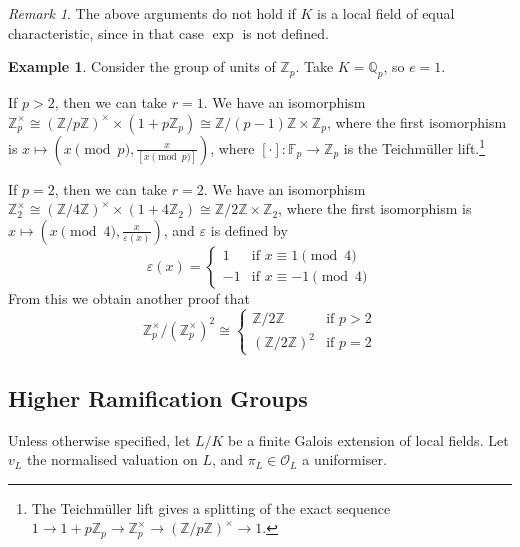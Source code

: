\documentclass[11pt]{article}
\theoremstyle{definition}
\newtheorem*{example}{Example}
\theoremstyle{plain}
\theoremstyle{remark}
\newtheorem*{remark}{Remark}
\newcommand{\FF}{\mathbb{F}}
\newcommand{\ZZ}{\mathbb{Z}}
\newcommand{\QQ}{\mathbb{Q}}
\newcommand{\cO}{\mathcal{O}}
\begin{document}
\begin{remark}
    The above arguments do not hold if $K$ is a local field of equal characteristic, since in that case $\exp$ is not defined.
\end{remark}

\begin{example}
    Consider the group of units of $\ZZ_p$. Take $K = \QQ_p$, so $e = 1$.

    If $p > 2$, then we can take $r = 1$.
    We have an isomorphism $\ZZ_p^\times \cong (\ZZ / p \ZZ)^\times \times (1 + p \ZZ_p) \cong \ZZ / (p-1) \ZZ \times \ZZ_p$, where the first isomorphism is $x \mapsto (x \pmod{p}, \frac{x}{[x \pmod{p}]})$, where $[\cdot] : \FF_p \to \ZZ_p$ is the Teichm\"uller lift.\footnote{The Teichm\"uller lift gives a splitting of the exact sequence $1 \rightarrow 1 + p \ZZ_p \rightarrow \ZZ_p^\times \rightarrow (\ZZ / p \ZZ)^\times \rightarrow 1$.}

    If $p = 2$, then we can take $r = 2$. We have an isomorphism $\ZZ_2^\times \cong (\ZZ / 4 \ZZ)^\times \times (1 + 4 \ZZ_2) \cong \ZZ / 2 \ZZ \times \ZZ_2$, where the first isomorphism is $x \mapsto (x \pmod{4}, \frac{x}{\varepsilon(x)})$, and $\varepsilon$ is defined by
    \begin{equation*}
        \varepsilon(x) = \begin{cases}
            1 & \text{if } x \equiv 1 \pmod{4}\\
            -1 & \text{if } x \equiv -1 \pmod{4}
        \end{cases}
    \end{equation*}
    From this we obtain another proof that
    \begin{equation*}
        \ZZ_p^\times / (\ZZ_p^\times)^2 \cong
        \begin{cases}
            \ZZ / 2 \ZZ & \text{if } p > 2\\
            (\ZZ / 2 \ZZ)^2 & \text{if } p = 2
        \end{cases}
    \end{equation*}
\end{example}

\subsection{Higher Ramification Groups}

Unless otherwise specified, let $L / K$ be a finite Galois extension of local fields. Let $v_L$ the normalised valuation on $L$, and $\pi_L \in \cO_L$ a uniformiser.
\end{document}
